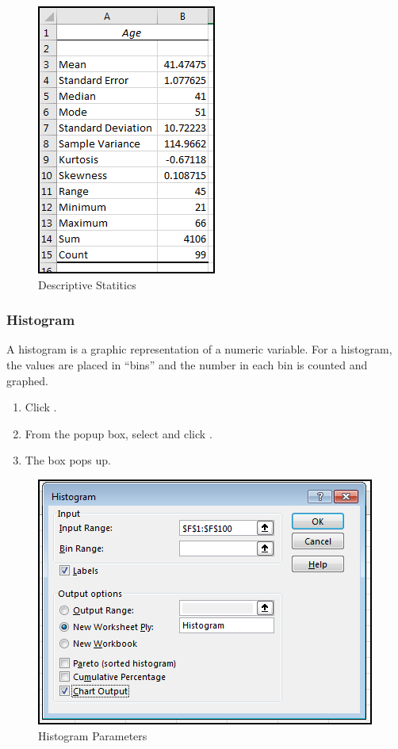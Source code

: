 \begin{figure}[H]
	\centering
	\includegraphics[width=\maxwidth{.95\linewidth}]{gfx/ch09_fig61}
	\caption{Descriptive Statitics}
	\label{09:fig61}
\end{figure}

\subsubsection{Histogram}

A histogram is a graphic representation of a numeric variable. For a histogram, the values are placed in ``bins'' and the number in each bin is counted and graphed. 

\begin{enumerate}[resume]
	\item Click .
	\item From the popup box, select  and click .
	\item The  box pops up.
\end{enumerate}

\begin{figure}[H]
	\centering
	\includegraphics[width=\maxwidth{.95\linewidth}]{gfx/ch09_fig62}
	\caption{Histogram Parameters}
	\label{09:fig62}
\end{figure}

